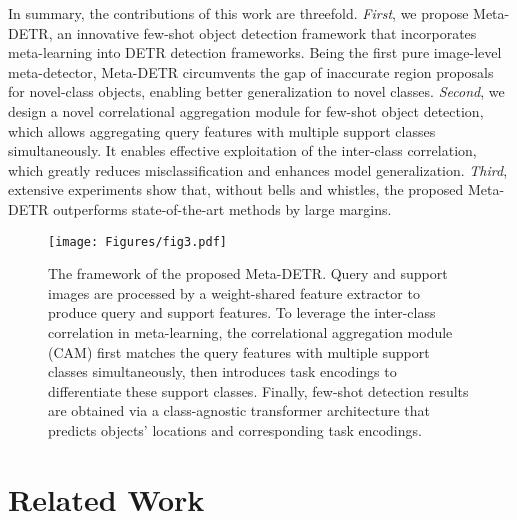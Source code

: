 \documentclass[letterpaper]{article} \usepackage{aaai22}  \usepackage{times}  \usepackage{helvet}  \usepackage{courier}  \usepackage[hyphens]{url}  \usepackage{graphicx} \urlstyle{rm} \def\UrlFont{\rm}  \usepackage{natbib}  \usepackage{caption} \DeclareCaptionStyle{ruled}{labelfont=normalfont,labelsep=colon,strut=off} \frenchspacing  \setlength{\pdfpagewidth}{8.5in}  \setlength{\pdfpageheight}{11in}  \usepackage{algorithm}
\begin{document}
In summary, the contributions of this work are threefold.
\textit{First}, we propose Meta-DETR, an innovative few-shot object detection framework that incorporates meta-learning into DETR detection frameworks. Being the first pure image-level meta-detector, Meta-DETR circumvents the gap of inaccurate region proposals for novel-class objects, enabling better generalization to novel classes.
\textit{Second}, we design a novel correlational aggregation module for few-shot object detection, which allows aggregating query features with multiple support classes simultaneously. It enables effective exploitation of the inter-class correlation, which greatly reduces misclassification and enhances model generalization.
\textit{Third}, extensive experiments show that, without bells and whistles, the proposed Meta-DETR outperforms state-of-the-art methods by large margins.



\begin{figure*}[t!] 
\begin{center}
   \texttt{[image: Figures/fig3.pdf]}
\end{center}
\vspace*{-4.0mm}
   \caption{
   The framework of the proposed Meta-DETR. Query and support images are processed by a weight-shared feature extractor to produce query and support features. To leverage the inter-class correlation in meta-learning, the correlational aggregation module (CAM) first matches the query features with multiple support classes simultaneously, then introduces task encodings to differentiate these support classes. Finally, few-shot detection results are obtained via a class-agnostic transformer architecture that predicts objects' locations and corresponding task encodings.
   }
\label{fig:fig3_architecture}
\vspace*{-1.0mm}
\end{figure*}



\section{Related Work}
\end{document}
